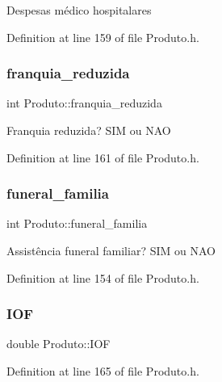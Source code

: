 Despesas médico hospitalares 

Definition at line 159 of file Produto.\+h.

\hypertarget{class_produto_ac0793fa6348f5c77a66fd5cf916d964b}{}\label{class_produto_ac0793fa6348f5c77a66fd5cf916d964b} 
\subsubsection{\texorpdfstring{franquia\+\_\+reduzida}{franquia\_reduzida}}
{\footnotesize\ttfamily int Produto\+::franquia\+\_\+reduzida\hspace{0.3cm}{\ttfamily [private]}}

Franquia reduzida? S\+IM ou N\+AO 

Definition at line 161 of file Produto.\+h.

\hypertarget{class_produto_a6fc727fd12d68f16a76fec4b9be086e7}{}\label{class_produto_a6fc727fd12d68f16a76fec4b9be086e7} 
\subsubsection{\texorpdfstring{funeral\+\_\+familia}{funeral\_familia}}
{\footnotesize\ttfamily int Produto\+::funeral\+\_\+familia\hspace{0.3cm}{\ttfamily [private]}}

Assistência funeral familiar? S\+IM ou N\+AO 

Definition at line 154 of file Produto.\+h.

\hypertarget{class_produto_a3e278c2012c4cb6b1f8a89b381b90e4f}{}\label{class_produto_a3e278c2012c4cb6b1f8a89b381b90e4f} 
\subsubsection{\texorpdfstring{I\+OF}{IOF}}
{\footnotesize\ttfamily double Produto\+::\+I\+OF\hspace{0.3cm}{\ttfamily [private]}}



Definition at line 165 of file Produto.\+h.

\hypertarget{class_produto_a0171a8d210819c3c3de0b8050ff6eff2}{}\label{class_produto_a0171a8d210819c3c3de0b8050ff6eff2} 
